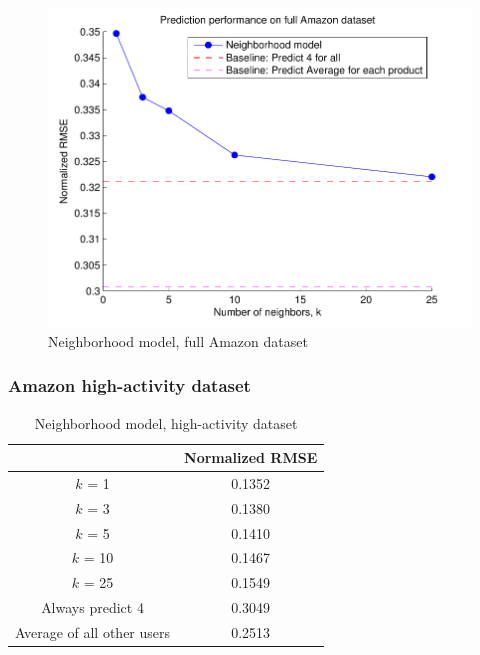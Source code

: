 \documentclass[letterpaper, 10 pt, conference]{ieeeconf}
\begin{document}
\begin{figure}[h]
\includegraphics[scale=0.6]{images/modelone_full.pdf}
\caption{Neighborhood model, full Amazon dataset}
\label{fig:modelone_full}
\end{figure}


\subsubsection{Amazon high-activity dataset}
\begin{table}[htb]
\centering
\begin{tabular}{|c|c|}
\cline{2-2}

\multicolumn{1}{c|}{}  & {Normalized RMSE} \tabularnewline \hline
$k$ = 1 & 0.1352  \tabularnewline
$k$ = 3 & 0.1380 \tabularnewline
$k$ = 5 &  0.1410 \tabularnewline
$k$ = 10 &  0.1467 \tabularnewline
$k$ = 25  &  0.1549 \tabularnewline
\hline
Always predict 4 & 0.3049 \tabularnewline 
Average of all other users & 0.2513 \tabularnewline
\hline
\end{tabular}
\caption{Neighborhood model, high-activity dataset}
\label{table:modelone_subset}
\end{table}
\end{document}
